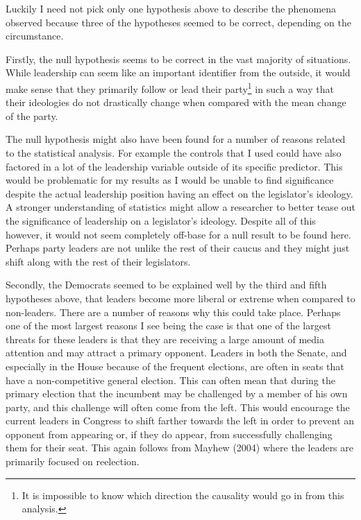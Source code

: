 \documentclass[12pt,twoside]{reedthesis}
\begin{document}
  Luckily I need not pick only one hypothesis above to describe the
  phenomena observed because three of the hypotheses seemed to be correct,
  depending on the circumstance.
  
  Firstly, the null hypothesis seems to be correct in the vast majority of
  situations. While leadership can seem like an important identifier from
  the outside, it would make sense that they primarily follow or lead
  their
  party\footnote{It is impossible to know which direction the causality would go in from this analysis.}
  in such a way that their ideologies do not drastically change when
  compared with the mean change of the party.
  
  The null hypothesis might also have been found for a number of reasons
  related to the statistical analysis. For example the controls that I
  used could have also factored in a lot of the leadership variable
  outside of its specific predictor. This would be problematic for my
  results as I would be unable to find significance despite the actual
  leadership position having an effect on the legislator's ideology. A
  stronger understanding of statistics might allow a researcher to better
  tease out the significance of leadership on a legislator's ideology.
  Despite all of this however, it would not seem completely off-base for a
  null result to be found here. Perhaps party leaders are not unlike the
  rest of their caucus and they might just shift along with the rest of
  their legislators.
  
  Secondly, the Democrats seemed to be explained well by the third and
  fifth hypotheses above, that leaders become more liberal or extreme when
  compared to non-leaders. There are a number of reasons why this could
  take place. Perhaps one of the most largest reasons I see being the case
  is that one of the largest threats for these leaders is that they are
  receiving a large amount of media attention and may attract a primary
  opponent. Leaders in both the Senate, and especially in the House
  because of the frequent elections, are often in seats that have a
  non-competitive general election. This can often mean that during the
  primary election that the incumbent may be challenged by a member of his
  own party, and this challenge will often come from the left. This would
  encourage the current leaders in Congress to shift farther towards the
  left in order to prevent an opponent from appearing or, if they do
  appear, from successfully challenging them for their seat. This again
  follows from Mayhew (2004) where the leaders are primarily focused on
  reelection.
  
\end{document}
